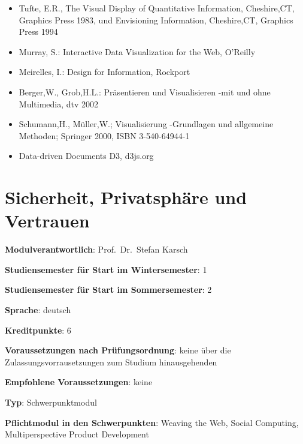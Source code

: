 \begin{itemize}
\tightlist
\item
  Tufte, E.R., The Visual Display of Quantitative Information,
  Cheshire,CT, Graphics Press 1983, und Envisioning Information,
  Cheshire,CT, Graphics Press 1994
\item
  Murray, S.: Interactive Data Visualization for the Web, O'Reilly
\item
  Meirelles, I.: Design for Information, Rockport
\item
  Berger,W., Grob,H.L.: Präsentieren und Visualisieren -mit und ohne
  Multimedia, dtv 2002
\item
  Schumann,H., Müller,W.; Visualisierung -Grundlagen und allgemeine
  Methoden; Springer 2000, ISBN 3-540-64944-1
\item
  Data-driven Documents D3, d3js.org
\end{itemize}

\chapter{Sicherheit, Privatsphäre und
Vertrauen\label{/mi-2017/modulbeschreibungen-master/MA_WTW_Modul_IT-Sicherheit}}\label{sicherheit-privatsphuxe4re-und-vertrauenpathlabelmi-2017modulbeschreibungen-mastermaux5fwtwux5fmodulux5fit-sicherheit}

\begin{modulHead}
\textbf{Modulverantwortlich}: Prof.~Dr.~Stefan
Karsch
\end{modulHead}
\begin{modulHead}
\textbf{Studiensemester für
Start im Wintersemester}:
1
\end{modulHead}
\begin{modulHead}
\textbf{Studiensemester für Start
im Sommersemester}:
2
\end{modulHead}
\begin{modulHead}
\textbf{Sprache}:
deutsch
\end{modulHead}
\begin{modulHead}
\textbf{Kreditpunkte}:
6
\end{modulHead}
\begin{modulHead}
\textbf{Voraussetzungen nach
Prüfungsordnung}: keine über die Zulassungsvorrausetzungen zum Studium
hinausgehenden
\end{modulHead}
\begin{modulHead}
\textbf{Empfohlene
Voraussetzungen}: keine
\end{modulHead}
\begin{modulHead}
\textbf{Typ}:
Schwerpunktmodul
\end{modulHead}
\begin{modulHead}
\textbf{Pflichtmodul
in den Schwerpunkten}: Weaving the Web, Social Computing,
Multiperspective Product Development
\end{modulHead}


